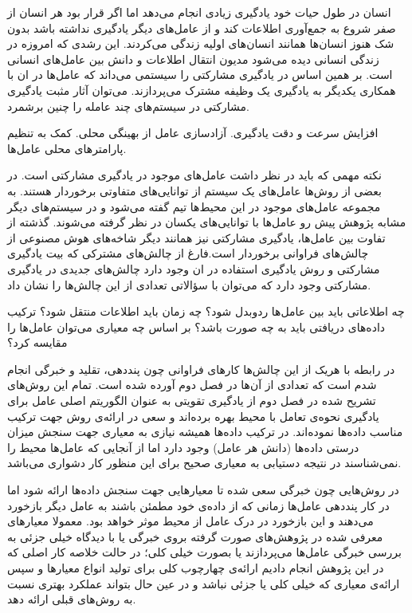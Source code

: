 انسان در طول حیات خود یادگیری زیادی انجام می‌دهد اما اگر قرار بود هر انسان از  صفر شروع به جمع‌آوری اطلاعات کند و از عامل‌های دیگر یادگیری نداشته باشد بدون شک هنوز انسان‌ها همانند انسان‌های اولیه زندگی می‌کردند. این رشدی که امروزه در زندگی انسانی دیده می‌شود مدیون انتقال اطلاعات و دانش بین عامل‌های انسانی است. بر همین اساس در یادگیری مشارکتی را سیستمی می‌داند که عامل‌ها در ان با همکاری یکدیگر به یادگیری یک وظیفه مشترک می‌پردازند. می‌توان آثار مثبت یادگیری مشارکتی در سیستم‌های چند عامله را چنین برشمرد.

\begin{itemize}%
 افزایش سرعت و دقت یادگیری.
 آزادسازی عامل از بهینگی محلی.
 کمک به تنظیم پارامترهای محلی عامل‌ها.
\end{itemize}

نکته مهمی که باید در نظر داشت عامل‌های موجود در یادگیری مشارکتی است. در بعضی از روش‌ها عامل‌های یک سیستم از توانایی‌های متفاوتی برخوردار هستند. به مجموعه عامل‌های موجود در این محیط‌ها تیم گفته می‌شود و در سیستم‌های دیگر مشابه پژوهش پیش رو عامل‌ها با توانایی‌های یکسان در نظر گرفته می‌شوند. گذشته از تفاوت بین عامل‌ها، یادگیری مشارکتی نیز همانند دیگر شاخه‌های هوش مصنوعی از چالش‌های فراوانی برخوردار است.فارغ از چالش‌های مشترکی که بیت یادگیری مشارکتی و روش یادگیری استفاده در ان وجود دارد چالش‌های جدیدی در یادگیری مشارکتی وجود دارد که می‌توان با سؤالاتی تعدادی از این چالش‌ها را نشان داد.

\begin{itemize}%
 چه اطلاعاتی باید بین عامل‌ها ردوبدل شود؟
 چه زمان باید اطلاعات منتقل شود؟
 ترکیب داده‌های دریافتی باید به چه صورت باشد؟
 بر اساس چه معیاری می‌توان عامل‌ها را مقایسه کرد؟
\end{itemize}

در رابطه با هریک از این چالش‌ها کارهای فراوانی چون پنددهی، تقلید و خبرگی انجام شدم است که تعدادی از آن‌ها در فصل دوم آورده شده است. تمام این روش‌‌های تشریح شده در فصل دوم از یادگیری تقویتی به عنوان الگوریتم اصلی عامل برای یادگیری نحوه‌ی تعامل با محیط بهره برده‌اند و سعی در ارائه‌ی روش جهت ترکیب مناسب داده‌ها نموده‌اند. در ترکیب داده‌ها همیشه نیازی به معیاری جهت سنجش میزان درستی داده‌ها (دانش هر عامل) وجود دارد اما از آنجایی که عامل‌ها محیط را نمی‌شناسند در نتیجه دستیابی به معیاری صحیح برای این منظور کار دشواری می‌باشد.

در روش‌هایی چون خبرگی سعی شده تا معیارهایی جهت سنجش داده‌ها ارائه شود اما در کار پنددهی عامل‌ها زمانی که از داده‌ی خود مطمئن باشند به عامل دیگر بازخورد می‌دهند و این بازخورد در درک عامل از محیط موثر خواهد بود. معمولا معیارهای معرفی شده در پژوهش‌های صورت گرفته بروی خبرگی یا با دیدگاه خیلی جزئی به بررسی خبرگی عامل‌ها می‌پردازند یا بصورت خیلی کلی؛ در حالت خلاصه کار اصلی که در این پژوهش انجام دادیم ارائه‌ی  چهارچوب کلی برای تولید انواع معیارها و سپس ارائه‌ی معیاری که خیلی کلی یا جزئی نباشد و در عین حال بتواند عملکرد بهتری نسبت به روش‌های قبلی ارائه دهد.